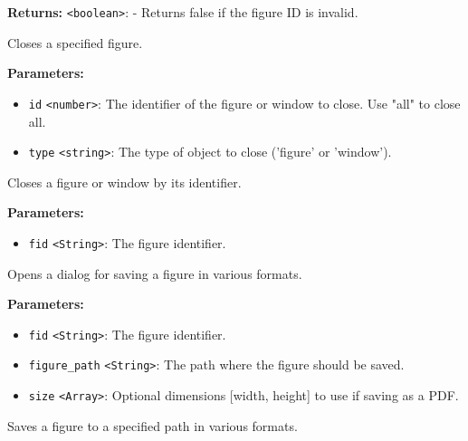 \documentclass[12pt,a4paper]{article}
\begin{document}
\noindent \textbf{Returns:} \texttt{<boolean>}: - Returns false if the figure ID is invalid.

\noindent Closes a specified figure.

\vspace{5mm}
\noindent {}


\noindent \textbf{Parameters:}
\begin{itemize}
  \item \texttt{id} \texttt{<number>}: The identifier of the figure or window to close. Use "all" to close all.
  \item \texttt{type} \texttt{<string>}: The type of object to close ('figure' or 'window').
\end{itemize}

\noindent Closes a figure or window by its identifier.

\vspace{5mm}
\noindent {}


\noindent \textbf{Parameters:}
\begin{itemize}
  \item \texttt{fid} \texttt{<String>}: The figure identifier.
\end{itemize}

\noindent Opens a dialog for saving a figure in various formats.

\vspace{5mm}
\noindent {}


\noindent \textbf{Parameters:}
\begin{itemize}
  \item \texttt{fid} \texttt{<String>}: The figure identifier.
  \item \texttt{figure\_path} \texttt{<String>}: The path where the figure should be saved.
  \item \texttt{size} \texttt{<Array>}: Optional dimensions [width, height] to use if saving as a PDF.
\end{itemize}

\noindent Saves a figure to a specified path in various formats.
\end{document}
